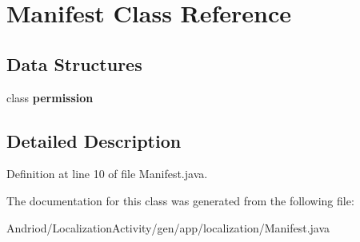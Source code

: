 \hypertarget{classapp_1_1localization_1_1_manifest}{\section{Manifest Class Reference}
\label{classapp_1_1localization_1_1_manifest}
}
\subsection*{Data Structures}
\begin{DoxyCompactItemize}
\item 
class {\bfseries permission}
\end{DoxyCompactItemize}


\subsection{Detailed Description}


Definition at line 10 of file Manifest.\-java.



The documentation for this class was generated from the following file\-:\begin{DoxyCompactItemize}
\item 
Andriod/\-Localization\-Activity/gen/app/localization/Manifest.\-java\end{DoxyCompactItemize}
